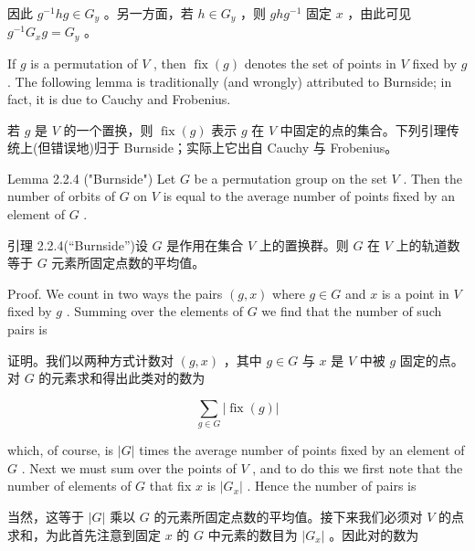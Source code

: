 \documentclass[10pt]{article}
\begin{document}
\begin{tcolorbox}\relax
因此 \({g}^{-1}{hg} \in  {G}_{y}\) 。另一方面，若 \(h \in  {G}_{y}\) ，则 \({gh}{g}^{-1}\) 固定 \(x\) ，由此可见 \({g}^{-1}{G}_{x}g = {G}_{y}\) 。
\end{tcolorbox}

If \(g\) is a permutation of \(V\) , then \(\operatorname{fix}\left( g\right)\) denotes the set of points in \(V\) fixed by \(g\) . The following lemma is traditionally (and wrongly) attributed to Burnside; in fact, it is due to Cauchy and Frobenius.

\begin{tcolorbox}\relax
若 \(g\) 是 \(V\) 的一个置换，则 \(\operatorname{fix}\left( g\right)\) 表示 \(g\) 在 \(V\) 中固定的点的集合。下列引理传统上(但错误地)归于 Burnside；实际上它出自 Cauchy 与 Frobenius。
\end{tcolorbox}

Lemma 2.2.4 ("Burnside") Let \(G\) be a permutation group on the set \(V\) . Then the number of orbits of \(G\) on \(V\) is equal to the average number of points fixed by an element of \(G\) .

\begin{tcolorbox}\relax
引理 2.2.4(“Burnside”)设 \(G\) 是作用在集合 \(V\) 上的置换群。则 \(G\) 在 \(V\) 上的轨道数等于 \(G\) 元素所固定点数的平均值。
\end{tcolorbox}

Proof. We count in two ways the pairs \(\left( {g,x}\right)\) where \(g \in  G\) and \(x\) is a point in \(V\) fixed by \(g\) . Summing over the elements of \(G\) we find that the number of such pairs is

\begin{tcolorbox}\relax
证明。我们以两种方式计数对 \(\left( {g,x}\right)\) ，其中 \(g \in  G\) 与 \(x\) 是 \(V\) 中被 \(g\) 固定的点。对 \(G\) 的元素求和得出此类对的数为
\end{tcolorbox}

\[
\mathop{\sum }\limits_{{g \in  G}}\left| {\operatorname{fix}\left( g\right) }\right|
\]

which, of course, is \(\left| G\right|\) times the average number of points fixed by an element of \(G\) . Next we must sum over the points of \(V\) , and to do this we first note that the number of elements of \(G\) that fix \(x\) is \(\left| {G}_{x}\right|\) . Hence the number of pairs is

\begin{tcolorbox}\relax
当然，这等于 \(\left| G\right|\) 乘以 \(G\) 的元素所固定点数的平均值。接下来我们必须对 \(V\) 的点求和，为此首先注意到固定 \(x\) 的 \(G\) 中元素的数目为 \(\left| {G}_{x}\right|\) 。因此对的数为
\end{tcolorbox}
\end{document}
